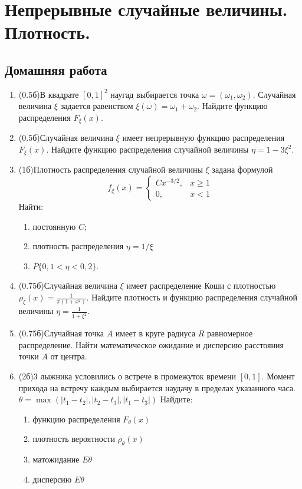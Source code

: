 \documentclass[a4paper, 14pt]{extarticle}
\begin{document}
\section*{Непрерывные случайные величины. Плотность.}
\subsection*{Домашняя работа}
\begin{enumerate}
\item (0.5б)В квадрате $[0,1]^2$ наугад выбирается точка $\omega=(\omega_1,\omega_2)$. Случайная величина $\xi$ задается равенством $\xi(\omega)=\omega_1+\omega_2$. Найдите функцию распределения $F_{\xi}(x)$.
	\item (0.5б)Случайная величина $\xi$ имеет непрерывную функцию распределения $F_{\xi}(x)$. 
Найдите функцию распределения случайной величины $\eta=1-3\xi^2$.
\item  (1б)Плотность распределения случайной величины $\xi$ задана формулой
	$$f_\xi(x) =\left\{
	\begin{array}{cc}
	Cx^{-3/2}, & x\geq 1 \\
	0, & x<1
	\end{array}\right.$$
	Найти: \begin{enumerate}
		\item постоянную $C$; 
		\item плотность распределения
	$\eta=1/\xi$ 
		\item $P\{0,1<\eta<0,2\}$.
	\end{enumerate}
	\item (0.75б)Случайная величина $\xi$ имеет распределение Коши с плотностью $\rho_{\xi}(x)=\frac{1}{\pi(1+x^2)}$. 
Найдите плотность и функцию распределения случайной величины $\eta = \frac{1}{1+\xi^2}$. 
	\item (0.75б)Случайная точка $A$ имеет в круге радиуса $R$
	равномерное распределение. Найти математическое
	ожидание и дисперсию расстояния  точки $A$ от центра.
	\item (2б)3 лыжника условились о встрече в промежуток времени $[0,1]$. 
	Момент прихода на встречу каждым выбирается наудачу в пределах
	указанного часа. $\theta = \max{(|t_1-t_2|,|t_2 - t_3|,|t_1-t_3|)}$
	Найдите:
    \begin{enumerate}
    \item функцию распределения $F_{\theta}(x)$
    \item плотность вероятности $\rho_{\theta}(x)$
    \item матожидание $E\theta$
    \item дисперсию $E\theta$
    \end{enumerate}
\end{enumerate}	
\end{document}

